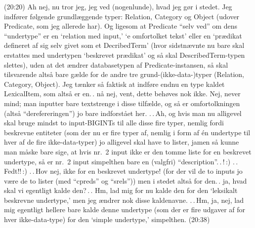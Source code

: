 \documentclass{report}
\begin{document}
(20:20) Ah nej, nu tror jeg, jeg ved (nogenlunde), hvad jeg gør i stedet. Jeg indfører følgende grundlæggende typer: Relation, Category og Object (udover Predicate, som jeg allerede har). Og ligesom at Predicate ``selv ved'' om dens ``undertype'' er en `relation med input,' `e omfortolket tekst' eller en `prædikat defineret af sig selv givet som et DecribedTerm' (hvor sidstnævnte nu bare skal erstattes med undertypen `beskrevet prædikat' og så skal DescribedTerm-typen slettes), uden at det ændrer databasetypen af Predicate-instansen, så skal tilsvarende altså bare gælde for de andre tre grund-(ikke-data-)typer (Relation, Category, Object). Jeg tænker så faktisk at indføre endnu en type kaldet LexicalItem, som altså er en.\,. nå nej, vent, dette behøves nok ikke. Nej, never mind; man inputter bare textstrenge i disse tilfælde, og så er omfortolkningen (altså ``derefereringen'') jo bare indforstået her. .\,.\,Ah, og hvis man nu alligevel skal bruge mindst to input-BIGINTs til alle disse fire typer, nemlig fordi beskrevne entiteter (som der nu er fire typer af, nemlig i form af én undertype til hver af de fire ikke-data-typer) jo alligevel skal have to lister, jamen så kunne man måske bare sige, at hvis nr.\ 2 input ikke er den tomme liste for en beskrevet undertype, så er nr.\ 2 input simpelthen bare en (valgfri) ``description''.\,.\,!\,:) .\,.\,Fedt!!\,:) .\,.\,Hov nej, ikke for en beskrevet undertype! (for der vil de to inputs jo være de to lister (med ``cpreds'' og ``srels'')) men i stedet altså for den.\,. ja, hvad skal vi egentligt kalde den?\,.\,. Hm, lad mig for nu kalde den for den `leksikalt beskrevne undertype,' men jeg ændrer nok disse kaldenavne. .\,.\,Hm, ja, nej, lad mig egentligt hellere bare kalde denne undertype (som der er fire udgaver af for hver ikke-data-type) for den `simple undertype,' simpelthen. (20:38)
\end{document}
